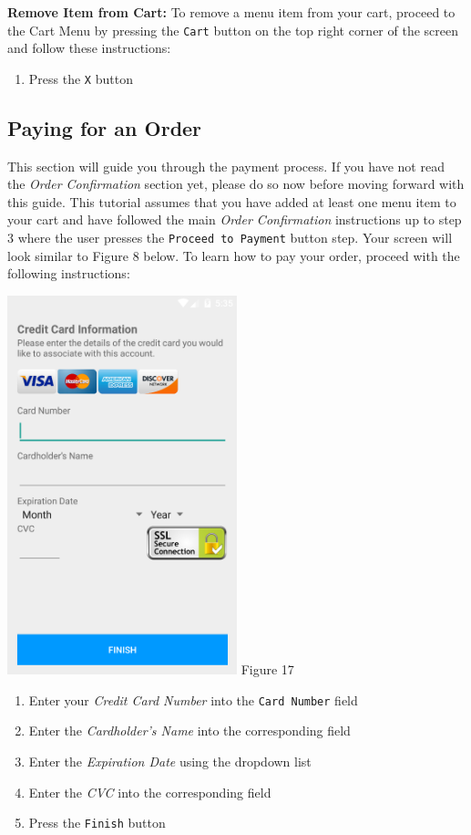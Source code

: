 \documentclass[12pt, titlepage]{article}
\begin{document}
		\textbf{Remove Item from Cart:}
	To remove a menu item from your cart, proceed to the Cart Menu by pressing the \texttt{Cart} button on the top right corner of the screen and follow these instructions:
	
	\begin{enumerate}
		\item Press the \texttt{X} button
	\end{enumerate}

\subsection{Paying for an Order}
This section will guide you through the payment process. If you have not read the \emph{Order Confirmation} section yet, please do so now before moving forward with this guide. This tutorial assumes that you have added at least one menu item to your cart and have followed the main \emph{Order Confirmation} instructions up to step 3 where the user presses the \texttt{Proceed to Payment} button step. Your screen will look similar to Figure 8 below. To learn how to pay your order, proceed with the following instructions:

	\begin{center}
		\includegraphics[width=0.5\textwidth]{cc.png}
		\linebreak Figure 17
	\end{center}
	\begin{enumerate}
		\item Enter your \emph{Credit Card Number} into the \texttt{Card 				Number}	field
		\item Enter the \emph{Cardholder's Name} into the corresponding 				field
		\item Enter the \emph{Expiration Date} using the dropdown list
		\item Enter the \emph{CVC} into the corresponding field
		\item Press the \texttt{Finish} button
	\end{enumerate}
\end{document}
